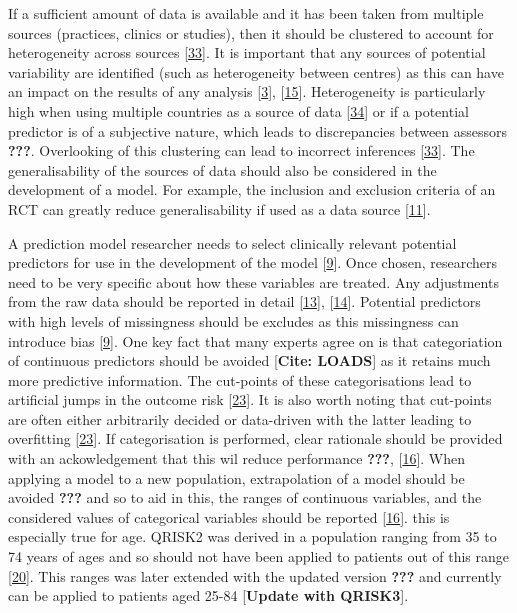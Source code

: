 \documentclass[12pt,PhD,twoside,openright]{muthesis}
\begin{document}
If a sufficient amount of data is available and it has been taken from multiple sources (practices, clinics or studies), then it should be clustered to account for heterogeneity across sources {[}\protect\hyperlink{ref-liquet_investigating_2012}{33}{]}. It is important that any sources of potential variability are identified (such as heterogeneity between centres) as this can have an impact on the results of any analysis {[}\protect\hyperlink{ref-hemingway_prognosis_2013}{3}{]}, {[}\protect\hyperlink{ref-riley_external_2016}{15}{]}. Heterogeneity is particularly high when using multiple countries as a source of data {[}\protect\hyperlink{ref-snell_multivariate_2016}{34}{]} or if a potential predictor is of a subjective nature, which leads to discrepancies between assessors {\textbf{???}}. Overlooking of this clustering can lead to incorrect inferences {[}\protect\hyperlink{ref-liquet_investigating_2012}{33}{]}. The generalisability of the sources of data should also be considered in the development of a model. For example, the inclusion and exclusion criteria of an RCT can greatly reduce generalisability if used as a data source {[}\protect\hyperlink{ref-moons_prognosis_2009}{11}{]}.

A prediction model researcher needs to select clinically relevant potential predictors for use in the development of the model {[}\protect\hyperlink{ref-royston_prognosis_2009}{9}{]}. Once chosen, researchers need to be very specific about how these variables are treated. Any adjustments from the raw data should be reported in detail {[}\protect\hyperlink{ref-collins_transparent_2015}{13}{]}, {[}\protect\hyperlink{ref-moons_transparent_2015}{14}{]}. Potential predictors with high levels of missingness should be excludes as this missingness can introduce bias {[}\protect\hyperlink{ref-royston_prognosis_2009}{9}{]}. One key fact that many experts agree on is that categoriation of continuous predictors should be avoided {[}\textbf{Cite: LOADS}{]} as it retains much more predictive information. The cut-points of these categorisations lead to artificial jumps in the outcome risk {[}\protect\hyperlink{ref-sauerbrei_selection_2007}{23}{]}. It is also worth noting that cut-points are often either arbitrarily decided or data-driven with the latter leading to overfitting {[}\protect\hyperlink{ref-sauerbrei_selection_2007}{23}{]}. If categorisation is performed, clear rationale should be provided with an ackowledgement that this wil reduce performance {\textbf{???}}, {[}\protect\hyperlink{ref-collins_systematic_2013}{16}{]}. When applying a model to a new population, extrapolation of a model should be avoided {\textbf{???}} and so to aid in this, the ranges of continuous variables, and the considered values of categorical variables should be reported {[}\protect\hyperlink{ref-collins_systematic_2013}{16}{]}. this is especially true for age. QRISK2 was derived in a population ranging from 35 to 74 years of ages and so should not have been applied to patients out of this range {[}\protect\hyperlink{ref-hippisley-cox_predicting_2008}{20}{]}. This ranges was later extended with the updated version {\textbf{???}} and currently can be applied to patients aged 25-84 {[}\textbf{Update with QRISK3}{]}.
\end{document}
